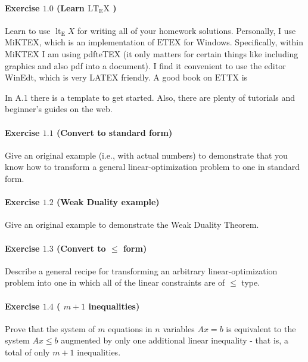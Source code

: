 \paragraph{Exercise $1.0$ (Learn $\mathrm{LT}_{\mathrm{E}} \mathrm{X}$ )}

Learn to use $\operatorname{lt}_{\mathrm{E}} X$ for writing all of your homework solutions. Personally, I use MiKTEX, which is an implementation of $\mathrm{ET} \mathrm{E} \mathrm{X}$ for Windows. Specifically, within MiKTEX I am using pdfteTEX (it only matters for certain things like including graphics and also pdf into a document). I find it convenient to use the editor WinEdt, which is very LATEX friendly. A good book on $\mathrm{ET} \mathrm{T} \mathrm{X}$ is

In A.1 there is a template to get started. Also, there are plenty of tutorials and beginner's guides on the web.

\paragraph{Exercise $1.1$ (Convert to standard form)}

Give an original example (i.e., with actual numbers) to demonstrate that you know how to transform a general linear-optimization problem to one in standard form.

\paragraph{Exercise $1.2$ (Weak Duality example)}

Give an original example to demonstrate the Weak Duality Theorem.

\paragraph{Exercise $1.3$ (Convert to $\leq$ form)}

Describe a general recipe for transforming an arbitrary linear-optimization problem into one in which all of the linear constraints are of $\leq$ type.

\paragraph{Exercise $1.4$ ( $m+1$ inequalities)}

Prove that the system of $m$ equations in $n$ variables $A x=b$ is equivalent to the system $A x \leq b$ augmented by only one additional linear inequality - that is, a total of only $m+1$ inequalities.

